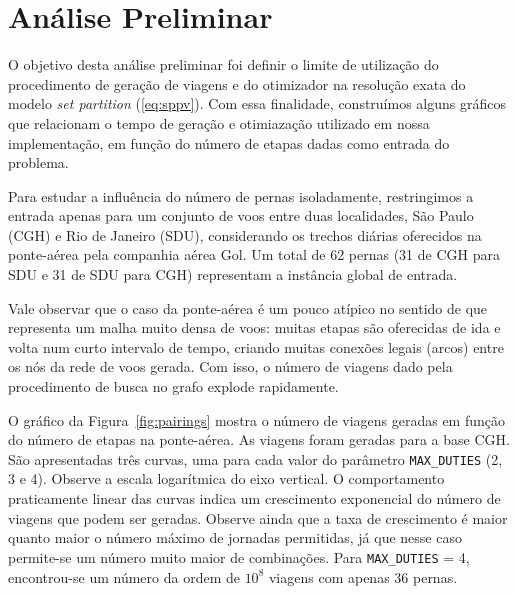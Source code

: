 
\section{Análise Preliminar}
\label{sec:preliminar}

O objetivo desta análise preliminar foi definir o limite de utilização do procedimento de geração
de viagens e do otimizador na resolução exata do modelo {\it set partition} (\ref{eq:sppv}).
Com essa finalidade, construímos alguns gráficos que relacionam o tempo de geração e otimiazação 
utilizado em nossa implementação, em função do número de etapas dadas como entrada do problema.

Para estudar a influência do número de pernas isoladamente, restringimos a entrada apenas para um
conjunto de voos entre duas localidades, São Paulo (CGH) e Rio de Janeiro (SDU), considerando os
trechos diárias oferecidos na ponte-aérea pela companhia aérea Gol. Um total de 62 pernas 
(31 de CGH para SDU e 31 de SDU para CGH) representam a instância global de entrada.

Vale observar que o caso da ponte-aérea é um pouco atípico no sentido de que representa um malha 
muito densa de voos: muitas etapas são oferecidas de ida e volta num curto intervalo de tempo, 
criando muitas conexões legais (arcos) entre os nós da rede de voos gerada. Com isso, o número
de viagens dado pela procedimento de busca no grafo explode rapidamente.

O gráfico da Figura~\ref{fig:pairings} mostra o número de viagens geradas em função do número de
etapas na ponte-aérea. As viagens foram geradas para a base CGH. São apresentadas três curvas, uma
para cada valor do parâmetro \verb|MAX_DUTIES| (2, 3 e 4). Observe a escala logarítmica do eixo
vertical. O comportamento praticamente linear das curvas indica um crescimento exponencial do número
de viagens que podem ser geradas. Observe ainda que a taxa de crescimento é maior quanto maior o
número máximo de jornadas permitidas, já que nesse caso permite-se um número muito maior de
combinações. Para \verb|MAX_DUTIES| = 4, encontrou-se um número da ordem de $10^8$ viagens com
apenas 36 pernas.

